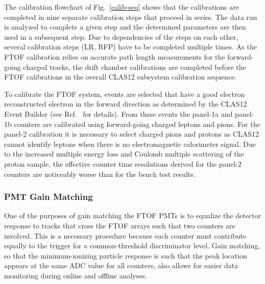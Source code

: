 \documentclass{elsart}
\begin{document}
The calibration flowchart of Fig.~\ref{calib-seq} shows that the calibrations are completed in nine separate
calibration steps that proceed in series. The data run is analyzed to complete a given step and the determined
parameters are then used in a subsequent step. Due to dependencies of the steps on each other, several calibration
steps (LR, RFP) have to be completed multiple times. As the FTOF calibration relies on accurate path length
measurements for the forward-going charged tracks, the drift chamber calibrations are completed before the
FTOF calibrations in the overall CLAS12 subsystem calibration sequence.

To calibrate the FTOF system, events are selected that have a good electron reconstructed electron in the
forward direction as determined by the CLAS12 Event Builder (see Ref.~\cite{daq-nim} for details). From
these events the panel-1a and panel-1b counters are calibrated using forward-going charged leptons and pions.
For the panel-2 calibration it is necessary to select charged pions and protons as CLAS12 cannot identify leptons
when there is no electromagnetic calorimeter signal. Due to the increased multiple energy loss and Coulomb multiple
scattering of the proton sample, the effective counter time resolutions derived for the panel-2 counters are
noticeably worse than for the bench test results.

\subsubsection{PMT Gain Matching}
\label{gain-matching}

One of the purposes of gain matching the FTOF PMTs is to equalize the detector response to tracks that
cross the FTOF arrays such that two counters are involved. This is a necessary procedure because each
counter must contribute equally to the trigger for a common-threshold discriminator level. Gain matching,
so that the minimum-ionizing particle response is such that the peak location appears at the same ADC
value for all counters, also allows for easier data monitoring during online and offline analyses.
\end{document}
